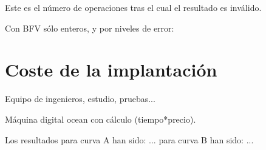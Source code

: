 Este es el número de operaciones tras el cual el resultado es inválido.

Con BFV sólo enteros, y por niveles de error:


\section{Coste de la implantación}

Equipo de ingenieros, estudio, pruebas...


Máquina digital ocean con cálculo (tiempo*precio).

Los resultados para curva A han sido: ...
para curva B han sido: ...
